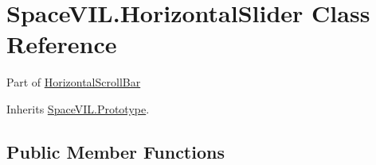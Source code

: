 \hypertarget{class_space_v_i_l_1_1_horizontal_slider}{}\section{Space\+V\+I\+L.\+Horizontal\+Slider Class Reference}
\label{class_space_v_i_l_1_1_horizontal_slider}


Part of \mbox{\hyperlink{class_space_v_i_l_1_1_horizontal_scroll_bar}{Horizontal\+Scroll\+Bar}}  




Inherits \mbox{\hyperlink{class_space_v_i_l_1_1_prototype}{Space\+V\+I\+L.\+Prototype}}.

\subsection*{Public Member Functions}
